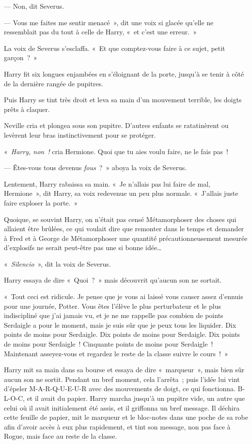 --- Non, dit Severus.

--- Vous me faites me sentir menacé~», dit une voix si glacée qu'elle ne ressemblait pas du tout à celle de Harry, «~et c'est une erreur.~»

La voix de Severus s'esclaffa.
«~Et que comptez-vous faire à ce sujet, petit garçon~?~»

Harry fit six longues enjambées en s'éloignant de la porte, jusqu'à se tenir à côté de la dernière rangée de pupitres.

Puis Harry se tint très droit et leva sa main d'un mouvement terrible, les doigts prêts à claquer.

Neville cria et plongea sous son pupitre.
D'autres enfants se ratatinèrent ou levèrent leur bras instinctivement pour se protéger.

«~\emph{Harry, non~!} cria Hermione.
Quoi que tu aies voulu faire, ne le fais pas~!

--- Êtes-vous tous devenus \emph{fous}~?~»
aboya la voix de Severus.

Lentement, Harry rabaissa sa main.
«~Je n'allais pas lui faire de mal, Hermione~», dit Harry, sa voix redevenue un peu plus normale.
«~J'allais juste faire exploser la porte.~»

Quoique, se souvint Harry, on n'était pas censé Métamorphoser des choses qui allaient être brûlées, ce qui voulait dire que remonter dans le temps et demander à Fred et à George de Métamorphoser une quantité précautionneusement mesurée d'explosifs ne serait peut-être pas une si bonne idée…

«~\emph{Silencio}~», dit la voix de Severus.

Harry essaya de dire «~Quoi~?~»
 mais découvrit qu'aucun son ne sortait.

«~Tout ceci est ridicule.
Je pense que je vous ai laissé vous causer assez d'ennuis pour une journée, Potter.
Vous êtes l'élève le plus perturbateur et le plus indiscipliné que j'ai jamais vu, et je ne me rappelle pas combien de points Serdaigle a pour le moment, mais je suis sûr que je peux tous les liquider.
Dix points de moins pour Serdaigle.
Dix points de moins pour Serdaigle.
Dix points de moins pour Serdaigle~!
Cinquante points de moins pour Serdaigle~!
Maintenant asseyez-vous et regardez le reste de la classe suivre le cours~!~»

Harry mit sa main dans sa bourse et essaya de dire «~marqueur~», mais bien sûr aucun son ne sortit.
Pendant un bref moment, cela l'arrêta~; puis l'idée lui vint d'épeler M-A-R-Q-U-E-U-R avec des mouvements de doigt, ce qui fonctionna.
B-L-O-C, et il avait du papier.
Harry marcha jusqu'à un pupitre vide, un autre que celui où il avait initialement été assis, et il griffonna un bref message.
Il déchira cette feuille de papier, mit le marqueur et le bloc-notes dans une poche de sa robe afin d'avoir accès à eux plus rapidement, et tint son message, non pas face à Rogue, mais face au reste de la classe.

